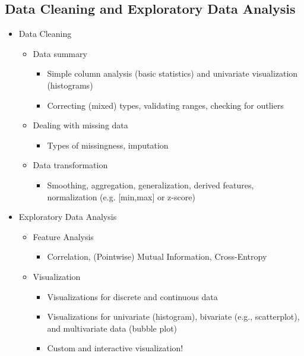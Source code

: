 \documentclass[11pt]{article}
\theoremstyle{definition}
\begin{document}
\subsection{Data Cleaning and Exploratory Data Analysis}
\begin{itemize}
  \item Data Cleaning
  \begin{itemize}
    \item Data summary
    \begin{itemize}
      \item Simple column analysis (basic statistics) and univariate visualization (histograms)
      \item Correcting (mixed) types, validating ranges, checking for outliers
    \end{itemize}
    \item Dealing with missing data
    \begin{itemize}
      \item Types of missingness, imputation
    \end{itemize}
    \item Data transformation
    \begin{itemize}
      \item Smoothing, aggregation, generalization, derived features, normalization (e.g. [min,max] or z-score)
    \end{itemize}
  \end{itemize}
  \item Exploratory Data Analysis
  \begin{itemize}
    \item Feature Analysis
    \begin{itemize}
      \item Correlation, (Pointwise) Mutual Information, Cross-Entropy
    \end{itemize}
    \item Visualization
    \begin{itemize}
      \item Visualizations for discrete and continuous data
      \item Visualizations for univariate (histogram), bivariate (e.g., scatterplot), and multivariate data (bubble plot)
      \item Custom and interactive visualization!
    \end{itemize}
  \end{itemize}
\end{itemize}
\end{document}
